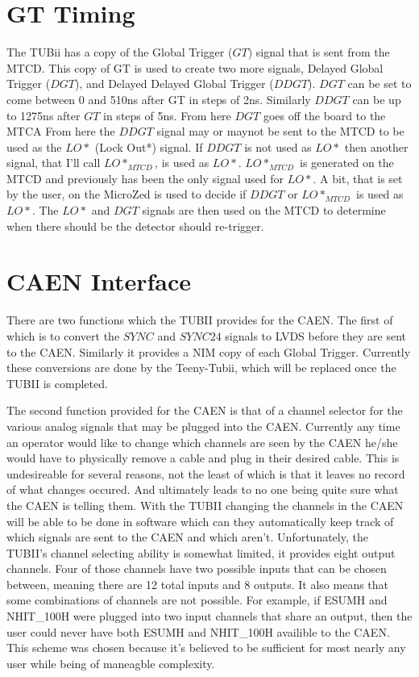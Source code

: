 \documentclass[11pt,a4paper]{article}
\begin{document}
\section{GT Timing}
\label{GTTiming}
The TUBii has a copy of the Global Trigger ($GT$) signal that is sent from the MTCD. This copy of GT is used to create two more signals, Delayed Global Trigger ($DGT$), and Delayed Delayed Global Trigger ($DDGT$). $DGT$ can be set to come between 0 and 510ns after GT in steps of 2ns. Similarly $DDGT$ can be up to 1275ns after $GT$ in steps of 5ns. From here $DGT$ goes off the board to the MTCA  From here the $DDGT$ signal may or maynot be sent to the MTCD to be used as the $LO*$ (Lock Out*) signal. If $DDGT$ is not used as $LO*$ then another signal, that I'll call $LO*_{MTCD}$, is used as $LO*$. $LO*_{MTCD}$ is generated on the MTCD and previously has been the only signal used for $LO*$. A bit, that is set by the user, on the MicroZed is used to decide if $DDGT$ or $LO*_{MTCD}$ is used as $LO*$. 
The $LO*$ and $DGT$ signals are then used on the MTCD to determine when there should be the detector should re-trigger.
 
\section{CAEN Interface}
There are two functions which the TUBII provides for the CAEN. The first of which is to convert the $SYNC$ and $SYNC24$ signals to LVDS before they are sent to the CAEN. Similarly it provides a NIM copy of each Global Trigger. Currently these conversions are done by the Teeny-Tubii, which will be replaced once the TUBII is completed. 

 The second function provided for the CAEN is that of a channel selector for the various analog signals that may be plugged into the CAEN. Currently any time an operator would like to change which channels are seen by the CAEN he/she would have to physically remove a cable and plug in their desired cable. This is undesireable for several reasons, not the least of which is that it leaves no record of what changes occured. And ultimately leads to no one being quite sure what the CAEN is telling them. With the TUBII changing the channels in the CAEN will be able to be done in software which can they automatically keep track of which signals are sent to the CAEN and which aren't. Unfortunately, the TUBII's channel selecting ability is somewhat limited, it provides eight output channels. Four of those channels have two possible inputs that can be chosen between, meaning there are 12 total inputs and 8 outputs. It also means that some combinations of channels are not possible. For example, if ESUMH and NHIT\_100H were plugged into two input channels that share an output, then the user could never have both ESUMH and NHIT\_100H availible to the CAEN. This scheme was chosen because it's believed to be sufficient for most nearly any user while being of maneagble complexity.
 
\end{document}
